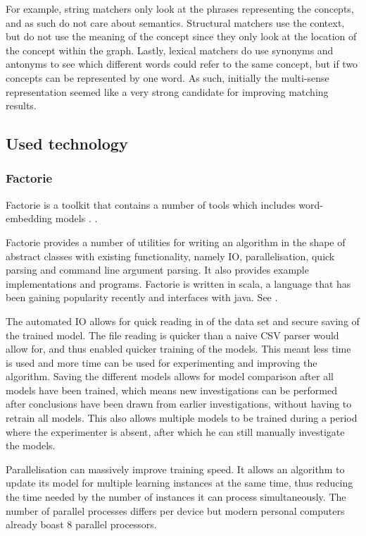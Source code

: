 \documentclass{article}
\begin{document}
 For example, string matchers only look at the phrases representing the concepts, and as such do not care about semantics. Structural matchers use the context, but do not use the meaning of the concept since they only look at the location of the concept within the graph. Lastly, lexical matchers do use synonyms and antonyms to see which different words could refer to the same concept, but if two concepts can be represented by one word. As such, initially the multi-sense representation seemed like a very strong candidate for improving matching results.
 
 \subsection{Used technology}
 \subsubsection{Factorie} \label{factorie}
 Factorie is a toolkit that contains a number of tools which includes word-embedding models \cite{git-factorie}. \cite{w2v}.
 
 Factorie provides a number of utilities for writing an algorithm in the shape of abstract classes with existing functionality, namely IO, parallelisation, quick parsing and command line argument parsing. It also provides example implementations and programs. Factorie is written in scala, a language that has been gaining popularity recently and interfaces with java. See \cite{scala}. 
 
 The automated IO allows for quick reading in of the data set and secure saving of the trained model. The file reading is quicker than a naive CSV parser would allow for, and thus enabled quicker training of the models. This meant less time is used and more time can be used for experimenting and improving the algorithm. Saving the different models allows for model comparison after all models have been trained, which means new investigations can be performed after conclusions have been drawn from earlier investigations, without having to retrain all models. This also allows multiple models to be trained during a period where the experimenter is absent, after which he can still manually investigate the models.
 
 Parallelisation can massively improve training speed. It allows an algorithm to update its model for multiple learning instances at the same time, thus reducing the time needed by the number of instances it can process simultaneously. The number of parallel processes differs per device but modern personal computers already boast 8 parallel processors.
 
\end{document}
